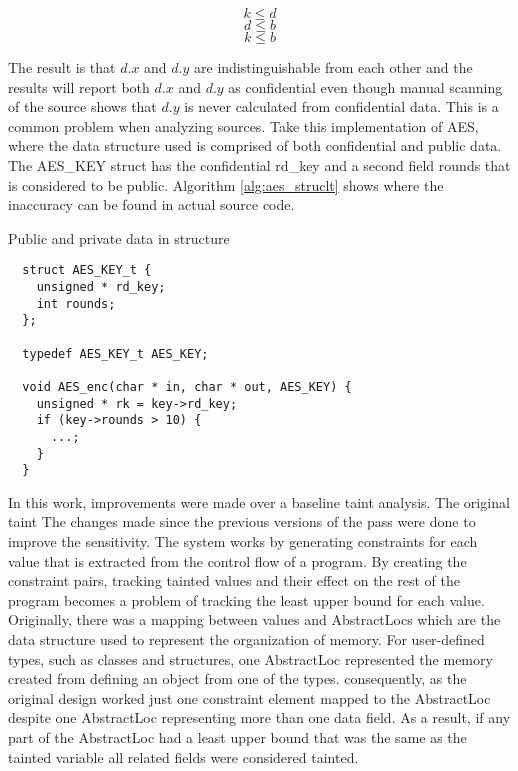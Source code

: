 \documentclass[11pt,a4paper]{article}
\begin{document}
\[
  k \leq d
\]
\[
  d \leq b
\]
\[
  k \leq b
\]

The result is that $d.x$ and $d.y$ are indistinguishable from each other and the
results will report both $d.x$ and $d.y$ as confidential even though manual
scanning of the source shows that $d.y$ is never calculated from confidential
data. This is a common problem when analyzing sources. Take this implementation
of AES, where the data structure used is comprised of both confidential and
public data. The AES\_KEY struct has the confidential rd\_key and a second field
rounds that is considered to be public. Algorithm \ref{alg:aes_struclt} shows
where the inaccuracy can be found in actual source code.

\begin{algorithm}
  \caption{Public and private data in structure}
  \label{alg:aes_struclt}
  \begin{lstlisting}
  struct AES_KEY_t {
    unsigned * rd_key;
    int rounds;
  };

  typedef AES_KEY_t AES_KEY;

  void AES_enc(char * in, char * out, AES_KEY) {
    unsigned * rk = key->rd_key;
    if (key->rounds > 10) {
      ...;
    }
  }
  \end{lstlisting}
\end{algorithm}

  In this work, improvements were made over a baseline taint analysis. The
  original taint  
  The changes made since the previous versions of the pass were done to improve
  the sensitivity. The system works by generating constraints for each value that
  is extracted from the control flow of a program. By creating the constraint
  pairs, tracking tainted values and their effect on  the rest of the program
  becomes a problem of tracking the least upper bound for each value.  Originally,
  there was a mapping between values and AbstractLocs which are the data structure
  used to represent the organization of memory. For user-defined types, such as
  classes and structures, one AbstractLoc represented the memory created from
  defining an object from one of the types. consequently, as the original design
  worked just one constraint element mapped to the AbstractLoc despite one
  AbstractLoc representing more than one data field. As a result, if any part of
  the AbstractLoc had a least upper bound that was the same as the tainted
  variable all related fields were considered tainted.
\end{document}
